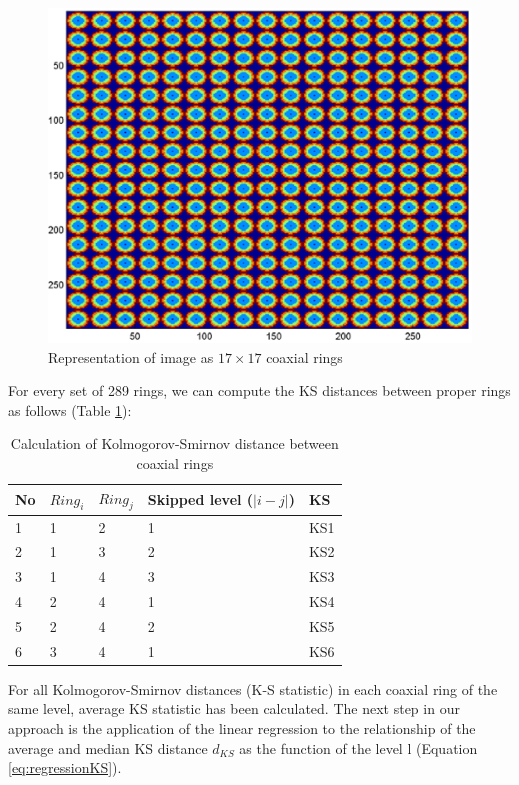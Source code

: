 \documentclass[review,12pt]{elsarticle}
\begin{document}
\begin{figure}
\center
\includegraphics[scale=0.6]{images/17x17rings.eps}
\caption{Representation of image as $17 \times 17$ coaxial rings}
\label{fig:17CoaxialRings}
\end{figure}

For every set of 289 rings, we can compute the KS distances between proper rings as follows (Table \ref{Tab:CalculationKSBEtRings}):

\begin{table}
\caption{Calculation of Kolmogorov-Smirnov distance between coaxial rings}
{
\begin{tabular}{@{}lllll}
\hline
No & $Ring_{i}$ & $Ring_{j}$ & Skipped level ($|i-j|$) & KS \\
\hline
1 & 1 & 2 & 1 & KS1 \\
2 & 1 & 3 & 2 & KS2 \\
3 & 1 & 4 & 3 & KS3 \\
4 & 2 & 4 & 1 & KS4 \\
5 & 2 & 4 & 2 & KS5 \\
6 & 3 & 4 & 1 & KS6 \\
\hline
\end{tabular}
}
\label{Tab:CalculationKSBEtRings}
\end{table}

For all Kolmogorov-Smirnov distances (K-S statistic) in each coaxial ring of the same level, average KS statistic has been calculated. The next step in our approach is the application of the linear regression to the relationship of the average and median KS distance $d_{KS}$ as the function of the level l (Equation \ref{eq:regressionKS}).
\end{document}
